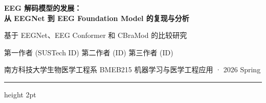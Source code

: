 \documentclass[12pt, a0paper]{article}
\begin{document}
\begin{center}
    {\fontsize{48}{58}\selectfont\bfseries\color{myblue}
        EEG 解码模型的发展：\\[2mm]
        从 EEGNet 到 EEG Foundation Model 的复现与分析\\[4mm]
    }

    {\fontsize{24}{32}\selectfont\color{mygray}
        基于 EEGNet、EEG Conformer 和 CBraMod 的比较研究\\[4mm]
    }

    {\fontsize{22}{28}\selectfont
        第一作者 (SUSTech ID) \hspace{2em} 第二作者 (ID) \hspace{2em} 第三作者 (ID)\\[2mm]
    }

    {\fontsize{16}{22}\selectfont\color{mygray}
        南方科技大学生物医学工程系 \hspace{3em}
        BMEB215 机器学习与医学工程应用 · 2026 Spring
    }

    \vspace{3mm}
    {\color{myblue}\hrule height 2pt}
    \vspace{3mm}
\end{center}
\end{document}
